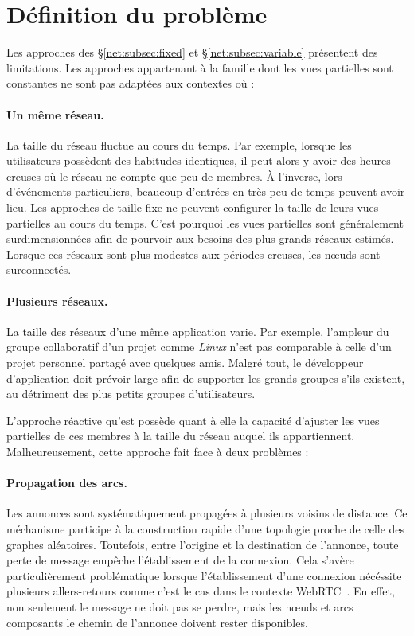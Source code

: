 
\section{Définition du problème}
\label{net:sec:problem}

Les approches des §\ref{net:subsec:fixed} et §\ref{net:subsec:variable} présentent des
limitations. Les approches appartenant à la famille dont les vues partielles
sont constantes ne sont pas adaptées aux contextes où :

\paragraph{Un même réseau.} La taille du réseau fluctue au cours du temps. Par
exemple, lorsque les utilisateurs possèdent des habitudes identiques, il peut
alors y avoir des heures creuses où le réseau ne compte que peu de membres. À
l'inverse, lors d'événements particuliers, beaucoup d'entrées en très peu de
temps peuvent avoir lieu.  Les approches de taille fixe ne peuvent configurer la
taille de leurs vues partielles au cours du temps. C'est pourquoi les vues
partielles sont généralement surdimensionnées afin de pourvoir aux besoins des
plus grands réseaux estimés. Lorsque ces réseaux sont plus modestes aux périodes
creuses, les nœuds sont surconnectés.

\paragraph{Plusieurs réseaux.} La taille des réseaux d'une même application
varie. Par exemple, l'ampleur du groupe collaboratif d'un projet comme
\emph{Linux} n'est pas comparable à celle d'un projet personnel partagé avec
quelques amis. Malgré tout, le développeur d'application doit prévoir large afin
de supporter les grands groupes s'ils existent, au détriment des plus petits
groupes d'utilisateurs.



L'approche réactive qu'est \SCAMP possède quant à elle la capacité d'ajuster les
vues partielles de ces membres à la taille du réseau auquel ils
appartiennent. Malheureusement, cette approche fait face à deux problèmes :

\paragraph{Propagation des arcs.} Les annonces sont systématiquement propagées à
plusieurs voisins de distance. Ce méchanisme participe à la construction rapide
d'une topologie proche de celle des graphes aléatoires. Toutefois, entre
l'origine et la destination de l'annonce, toute perte de message empêche
l'établissement de la connexion. Cela s'avère particulièrement problématique
lorsque l'établissement d'une connexion nécéssite plusieurs allers-retours comme
c'est le cas dans le contexte WebRTC~\cite{webrtc}. En effet, non seulement le
message ne doit pas se perdre, mais les nœuds et arcs composants le chemin de
l'annonce doivent rester disponibles.

